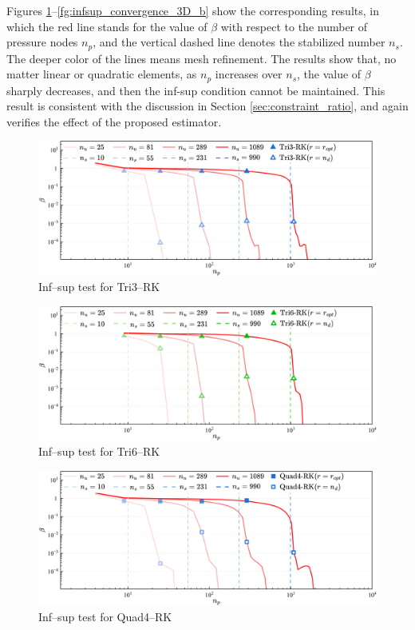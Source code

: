 Figures \ref{fg:infsup_convergence_2D_a}--\ref{fg:infsup_convergence_3D_b} show the corresponding results, in which the red line stands for the value of $\beta$ with respect to the number of pressure nodes $n_p$, and the vertical dashed line denotes the stabilized number $n_s$. The deeper color of the lines means mesh refinement. The results show that, no matter linear or quadratic elements, as $n_p$ increases over $n_s$, the value of $\beta$ sharply decreases, and then the inf-sup condition cannot be maintained. This result is consistent with the discussion in Section \ref{sec:constraint_ratio}, and again verifies the effect of the proposed estimator.

\begin{figure}[H]
\centering
\includegraphics[width=\textwidth]{png/tri3.png}
\caption{Inf--sup test for Tri3--RK}\label{fg:infsup_convergence_2D_a}
\end{figure}

\begin{figure}[H]
\centering
\includegraphics[width=\textwidth]{png/tri6.png}\caption{Inf--sup test for Tri6--RK}\label{fg:infsup_convergence_2D_b}
\end{figure}

\begin{figure}[H]
\centering
\includegraphics[width=\textwidth]{png/quad4.png}\caption{Inf--sup test for Quad4--RK}\label{fg:infsup_convergence_2D_c}
\end{figure}


